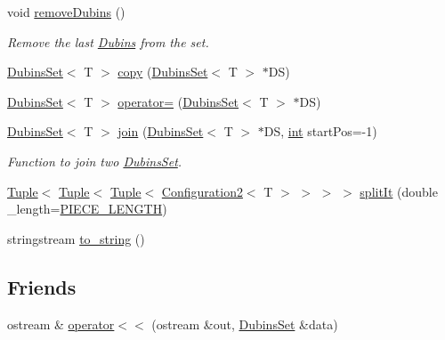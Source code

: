 \begin{DoxyCompactItemize}
void \mbox{\hyperlink{class_dubins_set_ae7243dad869372a527c4229193f6303b}{remove\+Dubins}} ()
\begin{DoxyCompactList}\small\item\em Remove the last {\ttfamily \mbox{\hyperlink{class_dubins}{Dubins}}} from the set. \end{DoxyCompactList}\item 
\mbox{\hyperlink{class_dubins_set}{Dubins\+Set}}$<$ T $>$ \mbox{\hyperlink{class_dubins_set_af3f067123eb6ab19028b3c0dd50c8226}{copy}} (\mbox{\hyperlink{class_dubins_set}{Dubins\+Set}}$<$ T $>$ $\ast$DS)
\item 
\mbox{\hyperlink{class_dubins_set}{Dubins\+Set}}$<$ T $>$ \mbox{\hyperlink{class_dubins_set_a72235c9cfc00e200b8a7fdf5efb4c126}{operator=}} (\mbox{\hyperlink{class_dubins_set}{Dubins\+Set}}$<$ T $>$ $\ast$DS)
\item 
\mbox{\hyperlink{class_dubins_set}{Dubins\+Set}}$<$ T $>$ \mbox{\hyperlink{class_dubins_set_ac6014ed731c39a23df08a4ec2c41ae0f}{join}} (\mbox{\hyperlink{class_dubins_set}{Dubins\+Set}}$<$ T $>$ $\ast$DS, \mbox{\hyperlink{draw_8hh_aa620a13339ac3a1177c86edc549fda9b}{int}} start\+Pos=-\/1)
\begin{DoxyCompactList}\small\item\em Function to join two \mbox{\hyperlink{class_dubins_set}{Dubins\+Set}}. \end{DoxyCompactList}\item 
\mbox{\hyperlink{class_tuple}{Tuple}}$<$ \mbox{\hyperlink{class_tuple}{Tuple}}$<$ \mbox{\hyperlink{class_tuple}{Tuple}}$<$ \mbox{\hyperlink{class_configuration2}{Configuration2}}$<$ T $>$ $>$ $>$ $>$ \mbox{\hyperlink{class_dubins_set_a3db386908cfe6d3c59b724add11dd367}{split\+It}} (double \+\_\+length=\mbox{\hyperlink{dubins_8hh_a5b2500ca93a5100f73dc442d3cfea7d4}{P\+I\+E\+C\+E\+\_\+\+L\+E\+N\+G\+TH}})
\item 
stringstream \mbox{\hyperlink{class_dubins_set_acfedfbe0ef1ff445cbaff93c70205f86}{to\+\_\+string}} ()
\end{DoxyCompactItemize}
\subsection*{Friends}
\begin{DoxyCompactItemize}
\item 
ostream \& \mbox{\hyperlink{class_dubins_set_af51d3dfa97a9eb56e9c5d066ed044f4a}{operator$<$$<$}} (ostream \&out, \mbox{\hyperlink{class_dubins_set}{Dubins\+Set}} \&data)
\end{DoxyCompactItemize}


